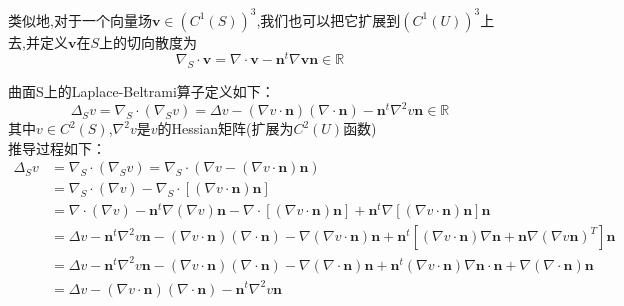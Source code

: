 \documentclass{article}
\begin{document}
类似地,对于一个向量场$\boldsymbol{v}\in(C^1(S))^3$,我们也可以把它扩展到$(C^1(U))^3$上去,并定义$\boldsymbol{v}$在$S$上的切向散度为
\begin{equation*}
\nabla_S\cdot\boldsymbol{v}=\nabla\cdot\boldsymbol{v}-\boldsymbol{n}^t\nabla\boldsymbol{v}\boldsymbol{n}\in\mathbb{R}
\end{equation*}

曲面S上的Laplace-Beltrami算子定义如下：
\begin{equation*}
\Delta_Sv=\nabla_S\cdot(\nabla_Sv)=\Delta v-(\nabla v\cdot\boldsymbol{n})(\nabla\cdot\boldsymbol{n})-\boldsymbol{n}^t\nabla^2v\boldsymbol{n}\in\mathbb{R}
\end{equation*}
其中$v\in C^2(S)$,$\nabla^2v$是$v$的Hessian矩阵(扩展为$C^2(U)$函数)\\
推导过程如下：
\begin{equation*}
\begin{aligned}
\Delta_Sv&=\nabla_S\cdot(\nabla_Sv)=\nabla_S\cdot(\nabla v-(\nabla v\cdot\boldsymbol{n})\boldsymbol{n})\\
&=\nabla_S\cdot(\nabla v)-\nabla_S\cdot[(\nabla v\cdot\boldsymbol{n})\boldsymbol{n}]\\
&=\nabla\cdot(\nabla v)-\boldsymbol{n}^t\nabla(\nabla v)\boldsymbol{n}-\nabla\cdot[(\nabla v\cdot\boldsymbol{n})\boldsymbol{n}]+\boldsymbol{n}^t\nabla[(\nabla v\cdot\boldsymbol{n})\boldsymbol{n}]\boldsymbol{n}\\
&=\Delta v-\boldsymbol{n}^t\nabla^2v\boldsymbol{n}-(\nabla v\cdot\boldsymbol{n})(\nabla\cdot\boldsymbol{n})-\nabla(\nabla v\cdot\boldsymbol{n})\boldsymbol{n}+\boldsymbol{n}^t[(\nabla v\cdot\boldsymbol{n})\nabla\boldsymbol{n}+\boldsymbol{n}\nabla(\nabla v\boldsymbol{n})^T]\boldsymbol{n}\\
&=\Delta v-\boldsymbol{n}^t\nabla^2v\boldsymbol{n}-(\nabla v\cdot\boldsymbol{n})(\nabla\cdot\boldsymbol{n})-\nabla(\nabla\cdot\boldsymbol{n})\boldsymbol{n}+\boldsymbol{n}^t(\nabla v\cdot\boldsymbol{n})\nabla\boldsymbol{n}\cdot\boldsymbol{n}+\nabla(\nabla\cdot\boldsymbol{n})\boldsymbol{n}\\
&=\Delta v-(\nabla v\cdot\boldsymbol{n})(\nabla\cdot\boldsymbol{n})-\boldsymbol{n}^t\nabla^2v\boldsymbol{n}
\end{aligned}
\end{equation*}
\end{document}
